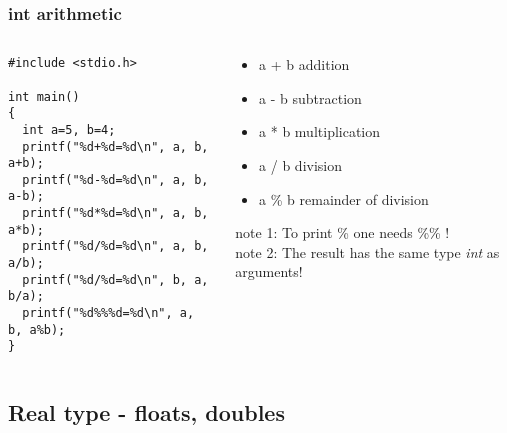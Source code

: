 \documentclass[10pt]{beamer}
\begin{document}
\begin{frame}[fragile]
  \frametitle{int arithmetic}
  \centering

  \begin{columns}
    \begin{column}{0.52\textwidth}
    \begin{lstlisting}
#include <stdio.h>

int main()
{
  int a=5, b=4;
  printf("%d+%d=%d\n", a, b, a+b);
  printf("%d-%d=%d\n", a, b, a-b);
  printf("%d*%d=%d\n", a, b, a*b);
  printf("%d/%d=%d\n", a, b, a/b);
  printf("%d/%d=%d\n", b, a, b/a);
  printf("%d%%%d=%d\n", a, b, a%b);
}
    \end{lstlisting}
    \end{column}
    \begin{column}{0.48\textwidth}
      \begin{itemize}
        \item a + b addition
        \item a - b subtraction
        \item a * b multiplication
        \item a / b division
        \item a \% b remainder of division
      \end{itemize}
      {\small note 1: To print \% one needs \%\%  !\\
      note 2: The result has the same type {\it int} as arguments!}
    \end{column}
  \end{columns}
\end{frame}

\subsection{Real type - floats, doubles}
\end{document}
